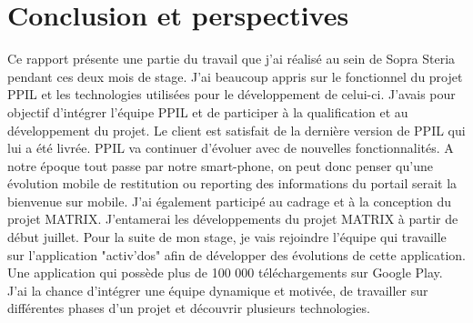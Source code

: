 \chapter*{Conclusion et perspectives}
\label{sec:conclusion}

Ce rapport présente une partie du travail que j'ai réalisé au sein de Sopra Steria pendant ces deux mois de stage. J'ai beaucoup appris sur le fonctionnel du projet PPIL et les technologies utilisées pour le développement de celui-ci. J'avais pour objectif d'intégrer l'équipe PPIL et de participer à la qualification et au développement du projet. Le client est satisfait de la dernière version de PPIL qui lui a été livrée. PPIL va continuer d'évoluer avec de nouvelles fonctionnalités. A notre époque tout passe par notre smart-phone, on peut donc penser qu'une évolution mobile de restitution ou reporting des informations du portail serait la bienvenue sur mobile. J'ai également participé au cadrage et à la conception du projet MATRIX. J'entamerai les développements du projet MATRIX à partir de début juillet. 
Pour la suite de mon stage, je vais rejoindre l'équipe qui travaille sur l'application "activ'dos" afin de développer des évolutions de cette application. Une application qui possède plus de 100 000 téléchargements sur Google Play. J'ai la chance d'intégrer une équipe dynamique et motivée, de travailler sur différentes phases d'un projet et découvrir plusieurs technologies.


